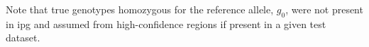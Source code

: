 \begin{table}[!htb]
\begin{threeparttable}

\begin{tablenotes}[para]\footnotesize
Note that true genotypes homozygous for the reference allele, $g_0$, were not present in \gls{ipg} and assumed from high-confidence regions if present in a given test dataset.
\end{tablenotes}
\end{threeparttable}
\end{table}
